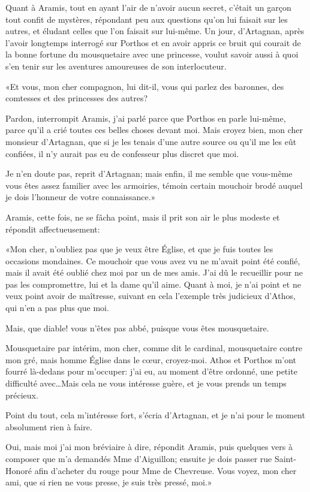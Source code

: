 Quant à Aramis, tout en ayant l'air de n'avoir aucun secret, c'était un garçon tout confit de mystères, répondant peu aux questions qu'on lui faisait sur les autres, et éludant celles que l'on faisait sur lui-même. Un jour, d'Artagnan, après l'avoir longtemps interrogé sur Porthos et en avoir appris ce bruit qui courait de la bonne fortune du mousquetaire avec une princesse, voulut savoir aussi à quoi s'en tenir sur les aventures amoureuses de son interlocuteur. 

«Et vous, mon cher compagnon, lui dit-il, vous qui parlez des baronnes, des comtesses et des princesses des autres? 

\speak  Pardon, interrompit Aramis, j'ai parlé parce que Porthos en parle lui-même, parce qu'il a crié toutes ces belles choses devant moi. Mais croyez bien, mon cher monsieur d'Artagnan, que si je les tenais d'une autre source ou qu'il me les eût confiées, il n'y aurait pas eu de confesseur plus discret que moi. 

\speak  Je n'en doute pas, reprit d'Artagnan; mais enfin, il me semble que vous-même vous êtes assez familier avec les armoiries, témoin certain mouchoir brodé auquel je dois l'honneur de votre connaissance.» 

Aramis, cette fois, ne se fâcha point, mais il prit son air le plus modeste et répondit affectueusement: 

«Mon cher, n'oubliez pas que je veux être Église, et que je fuis toutes les occasions mondaines. Ce mouchoir que vous avez vu ne m'avait point été confié, mais il avait été oublié chez moi par un de mes amis. J'ai dû le recueillir pour ne pas les compromettre, lui et la dame qu'il aime. Quant à moi, je n'ai point et ne veux point avoir de maîtresse, suivant en cela l'exemple très judicieux d'Athos, qui n'en a pas plus que moi. 

\speak  Mais, que diable! vous n'êtes pas abbé, puisque vous êtes mousquetaire. 

\speak  Mousquetaire par intérim, mon cher, comme dit le cardinal, mousquetaire contre mon gré, mais homme Église dans le cœur, croyez-moi. Athos et Porthos m'ont fourré là-dedans pour m'occuper: j'ai eu, au moment d'être ordonné, une petite difficulté avec\dots Mais cela ne vous intéresse guère, et je vous prends un temps précieux. 

\speak  Point du tout, cela m'intéresse fort, s'écria d'Artagnan, et je n'ai pour le moment absolument rien à faire. 

\speak  Oui, mais moi j'ai mon bréviaire à dire, répondit Aramis, puis quelques vers à composer que m'a demandés Mme d'Aiguillon; ensuite je dois passer rue Saint-Honoré afin d'acheter du rouge pour Mme de Chevreuse. Vous voyez, mon cher ami, que si rien ne vous presse, je suis très pressé, moi.» 

